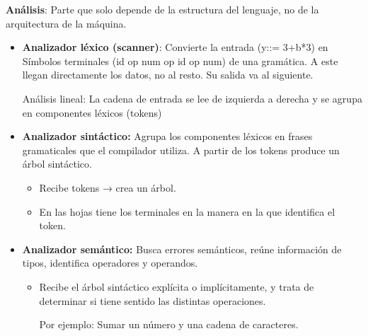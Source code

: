 \documentclass[12pt, twoside, openright]{report} %
\begin{document}
\textbf{Análisis}: Parte que solo depende de la estructura del lenguaje, no de la arquitectura de la máquina.
\begin{itemize}
	\item \textbf{Analizador léxico (scanner)}: Convierte la entrada (y::= 3+b*3) en Símbolos terminales (id op num op id op num) de una gramática. A este llegan directamente los datos, no al resto. Su salida va al siguiente.

	      Análisis lineal: La cadena de entrada se lee de izquierda a derecha y se agrupa en componentes léxicos (tokens)

	      \begin{figure}[H]
		      {\def\svgwidth{.8\textwidth}
			      }
	      \end{figure}
	\item \textbf{Analizador sintáctico:} Agrupa los componentes léxicos en frases
	      gramaticales que el compilador utiliza. A partir de los tokens produce
	      un árbol sintáctico.

	      \begin{itemize}
		      \item Recibe tokens → crea un árbol.
		      \item En las hojas tiene los terminales en la manera en la que identifica el
		            token.
	      \end{itemize}

	      \begin{figure}[H]
		      {\def\svgwidth{.8\textwidth}
			      }
	      \end{figure}
	      \pagebreak
	\item \textbf{Analizador semántico:} Busca errores semánticos, reúne información de tipos, identifica operadores y operandos.

	      \begin{itemize}
		      \item Recibe el árbol sintáctico explícita o implícitamente, y trata de
		            determinar si tiene sentido las distintas operaciones.

		            Por ejemplo: Sumar un número y una cadena de caracteres.
	      \end{itemize}
\end{itemize}
\end{document}

